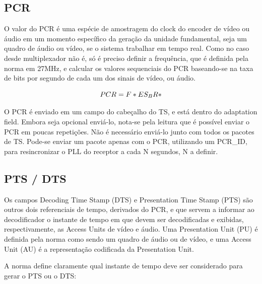 \documentclass[
	12pt,				%
	openright,			%
	twoside,			%
	a4paper,			%
	english,			%
	french,				%
	brazil				%
	]{abntex2}
\begin{document}
\subsection{PCR}
O valor do PCR é uma espécie de amostragem do clock do encoder de vídeo ou áudio em um momento específico
da geração da unidade fundamental, seja um quadro de áudio ou vídeo, se o sistema trabalhar em tempo real.
Como no caso desde multiplexador não é, só é preciso definir
a frequência, que é definida pela norma em 27MHz, e calcular os valores sequenciais do PCR baseando-se 
na taxa de bits por segundo de cada um dos sinais de vídeo, ou áudio.

\begin{equation}
$$
PCR = F * ES_BR * 
$$
\end{equation}

O PCR é enviado em  um campo do cabeçalho do TS, e está dentro do adaptation field. Embora seja opcional enviá-lo,
nota-se pela leitura que é possível enviar o PCR em poucas repetições. Não é necessário enviá-lo junto
com todos os pacotes de TS. Pode-se enviar um pacote apenas com o PCR, utilizando um PCR\_ID, para resincronizar o
PLL do receptor a cada N segundos, N a definir.


\subsection{PTS / DTS}

Os campos Decoding Time Stamp (DTS) e Presentation Time Stamp (PTS) são outros dois referenciais de tempo,
derivados do PCR, e que servem a informar ao decodificador o instante de tempo em que devem ser decodificadas
e exibidas, respectivamente, as Access Units de vídeo e áudio. Uma Presentation Unit (PU) é definida pela
norma como sendo um quadro de áudio ou de vídeo, e uma Access Unit (AU) é a representação codificada 
da Presentation Unit.

A norma define claramente qual instante de tempo deve ser considerado para gerar o PTS ou o DTS:


\end{document}
